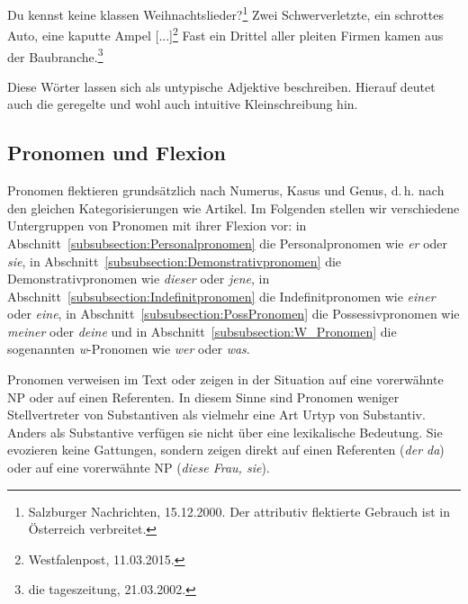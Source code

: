\ea \label{ea:Adkopilae_Adj_Fx}
\ea \label{ea:klassen} Du kennst keine klassen Weihnachtslieder?\footnote{Salzburger Nachrichten, 15.12.2000. Der attributiv flektierte Gebrauch ist in Österreich verbreitet.}
\ex \label{ex:schrotten} Zwei Schwerverletzte, ein schrottes Auto, eine kaputte Ampel [...]\footnote{Westfalenpost, 11.03.2015.}
\ex \label{ex:pleiter} Fast ein Drittel aller pleiten Firmen kamen aus der Baubranche.\footnote{die tageszeitung, 21.03.2002.}
\z 
\z 

Diese Wörter lassen sich als untypische Adjektive beschreiben. Hierauf deutet auch die geregelte und wohl auch intuitive Kleinschreibung hin.  


\subsection{Pronomen und Flexion}\label{subsection:Pronomen_Flexion}
\largerpage

Pronomen flektieren grundsätzlich nach Numerus, Kasus und Genus, d.\,h. nach den gleichen Kategorisierungen wie Artikel. Im Folgenden stellen wir verschiedene Untergruppen von Pronomen mit ihrer Flexion vor: in Abschnitt~\ref{subsubsection:Personalpronomen} die Personalpronomen wie \textit{er} oder \textit{sie}, in Abschnitt~\ref{subsubsection:Demonstrativpronomen} die Demonstrativpronomen wie \textit{dieser} oder \textit{jene}, in Abschnitt~\ref{subsubsection:Indefinitpronomen} die Indefinitpronomen wie \textit{einer} oder \textit{eine}, in Abschnitt~\ref{subsubsection:PossPronomen} die Possessivpronomen wie \textit{meiner} oder \textit{deine} und in Abschnitt~\ref{subsubsection:W_Pronomen} die sogenannten \textit{w}-Pronomen wie \textit{wer} oder \textit{was}.

Pronomen verweisen im Text oder zeigen in der Situation auf eine vorerwähnte NP oder auf einen Referenten. In diesem Sinne sind Pronomen weniger Stellvertreter von Substantiven als vielmehr eine Art Urtyp von Substantiv. Anders als Substantive verfügen sie nicht über eine lexikalische Bedeutung. Sie evozieren keine Gattungen, sondern zeigen direkt auf einen Referenten (\textit{der da}) oder auf eine vorerwähnte NP (\textit{diese Frau, sie}). 

